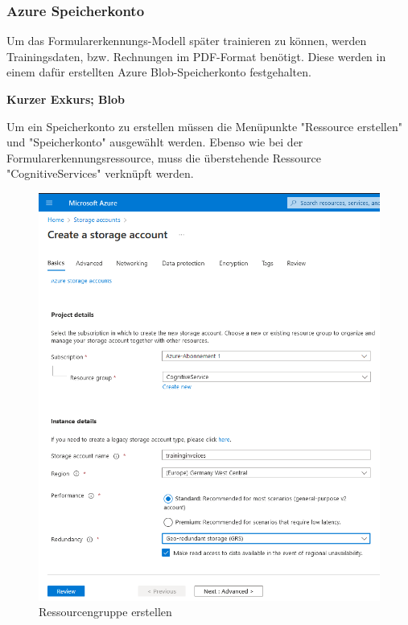 \subsubsection{Azure Speicherkonto}\label{sec:azure-blob}
Um das Formularerkennungs-Modell später trainieren zu können, werden Trainingsdaten, bzw. Rechnungen im PDF-Format benötigt.
Diese werden in einem dafür erstellten Azure Blob-Speicherkonto festgehalten.

\textbf{Kurzer Exkurs; Blob}


Um ein Speicherkonto zu erstellen müssen die Menüpunkte "Ressource erstellen" und "Speicherkonto" ausgewählt werden. Ebenso wie
bei der Formularerkennungsressource, muss die überstehende Ressource "CognitiveServices" verknüpft werden.

\begin{figure}[h]
    \centering
    \includegraphics[scale=0.6]{sections/cloud-computing/images/azure-speicherkonto.PNG}
    \caption{Ressourcengruppe erstellen}
    \label{fig:ressourcen-erstellen}
\end{figure}

